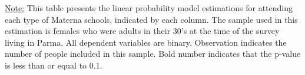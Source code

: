 \begin{footnotesize}
\noindent\underline{Note:} This table presents the linear probability model estimations for attending each type of Materna schools, indicated by each column. The sample used in this estimation is females who were adults in their 30's at the time of the survey living in Parma. All dependent variables are binary. Observation indicates the number of people included in this sample. Bold number indicates that the p-value is less than or equal to 0.1.
\end{footnotesize}
